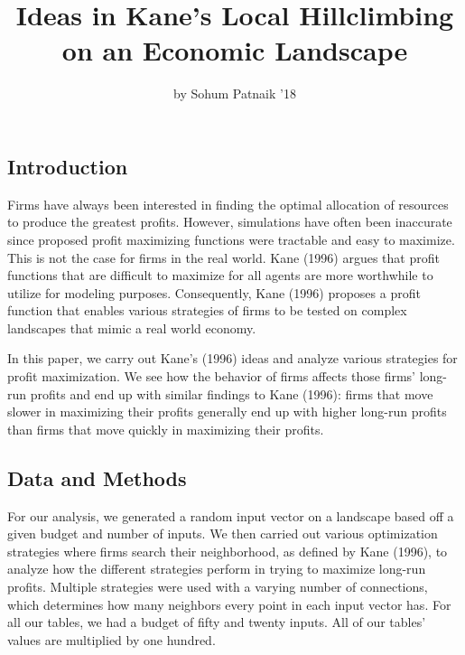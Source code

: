 \title{Ideas in Kane's Local Hillclimbing on an Economic Landscape}
\author{by Sohum Patnaik '18}

\maketitle


\subsection{Introduction}\label{introduction}

Firms have always been interested in finding the optimal allocation of
resources to produce the greatest profits. However, simulations have
often been inaccurate since proposed profit maximizing functions were
tractable and easy to maximize. This is not the case for firms in the
real world. Kane (1996) argues that profit functions that are difficult
to maximize for all agents are more worthwhile to utilize for modeling
purposes. Consequently, Kane (1996) proposes a profit function that
enables various strategies of firms to be tested on complex landscapes
that mimic a real world economy.

In this paper, we carry out Kane's (1996) ideas and analyze various
strategies for profit maximization. We see how the behavior of firms
affects those firms' long-run profits and end up with similar findings
to Kane (1996): firms that move slower in maximizing their profits
generally end up with higher long-run profits than firms that move
quickly in maximizing their profits.

\subsection{Data and Methods}\label{data-and-methods}

For our analysis, we generated a random input vector on a landscape
based off a given budget and number of inputs. We then carried out
various optimization strategies where firms search their neighborhood,
as defined by Kane (1996), to analyze how the different strategies
perform in trying to maximize long-run profits. Multiple strategies were
used with a varying number of connections, which determines how many
neighbors every point in each input vector has. For all our tables,
we had a budget of fifty and twenty inputs. All of our tables' values
are multiplied by one hundred.

